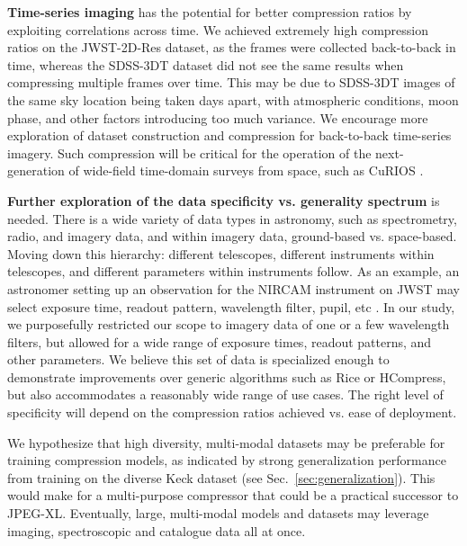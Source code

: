 \textbf{Time-series imaging} has the potential for better compression ratios by exploiting correlations across time. We achieved extremely high compression ratios on the JWST-2D-Res dataset, as the frames were collected back-to-back in time, whereas the SDSS-3DT dataset did not see the same results when compressing multiple frames over time. This may be due to SDSS-3DT images of the same sky location being taken days apart, with atmospheric conditions, moon phase, and other factors introducing too much variance. We encourage more exploration of dataset construction and compression for back-to-back time-series imagery. Such compression will be critical for the operation of the next-generation of wide-field time-domain surveys from space, such as CuRIOS \citep{2022cosp...44.1985G}.




\textbf{Further exploration of the data specificity vs. generality spectrum} is needed. There is a wide variety of data types in astronomy, such as spectrometry, radio, and imagery data, and within imagery data, ground-based vs. space-based. Moving down this hierarchy: different telescopes, different instruments within telescopes, and different parameters within instruments follow. As an example, an astronomer setting up an observation for the NIRCAM instrument on JWST may select exposure time, readout pattern, wavelength filter, pupil, etc \citep{jwst2024}. In our study, we purposefully restricted our scope to imagery data of one or a few wavelength filters, but allowed for a wide range of exposure times, readout patterns, and other parameters. We believe this set of data is specialized enough to demonstrate improvements over generic algorithms such as Rice or HCompress, but also accommodates a reasonably wide range of use cases. The right level of specificity will depend on the compression ratios achieved vs. ease of deployment.

We hypothesize that high diversity, multi-modal datasets may be preferable for training compression models, as indicated by strong generalization performance from training on the diverse Keck dataset (see Sec.~\ref{sec:generalization}).
This would make for a multi-purpose compressor that could be a practical successor to JPEG-XL. Eventually, large, multi-modal models and datasets may leverage imaging, spectroscopic and catalogue data all at once. 